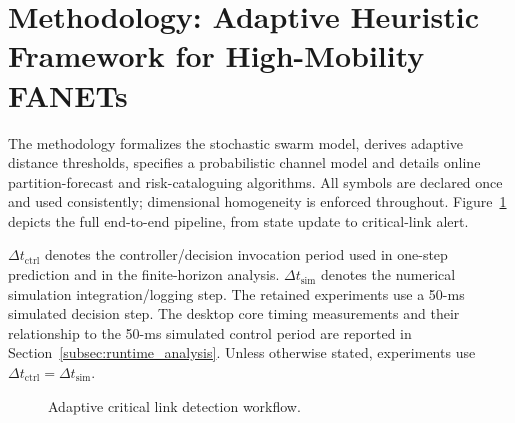 \documentclass[preprint,12pt]{elsarticle}
\newif\ifcolor\colortrue
\theoremstyle{definition}\newtheorem{definition}{Definition}
\theoremstyle{plain}\newtheorem{theorem}{Theorem}
\theoremstyle{plain}\newtheorem{lemma}{Lemma}
\theoremstyle{plain}\newtheorem{corollary}{Corollary}
\theoremstyle{plain}\newtheorem{assumption}{Assumption}
\theoremstyle{remark}\newtheorem{remark}[theorem]{Remark}
\begin{document}
\section{Methodology: Adaptive Heuristic Framework for High-Mobility FANETs}
\label{sec:methodology}

The methodology formalizes the stochastic swarm model, derives adaptive distance thresholds, specifies a probabilistic channel model and details online partition-forecast and risk-cataloguing algorithms.  All symbols are declared once and used consistently; dimensional homogeneity is enforced throughout. Figure~\ref{fig:framework} depicts the full end-to-end pipeline, from state update to critical-link alert.

$\Delta t_{\text{ctrl}}$ denotes the controller/decision invocation period used in one-step prediction and in the finite-horizon analysis. $\Delta t_{\text{sim}}$ denotes the numerical simulation integration/logging step. The retained experiments use a 50-ms simulated decision step. The desktop core timing measurements and their relationship to the 50-ms simulated control period are reported in Section~\ref{subsec:runtime_analysis}. Unless otherwise stated, experiments use $\Delta t_{\text{ctrl}}=\Delta t_{\text{sim}}$.

\begin{figure}[ht]
  \centering
  \caption{Adaptive critical link detection workflow.}
  \label{fig:framework}
\end{figure}
\end{document}
